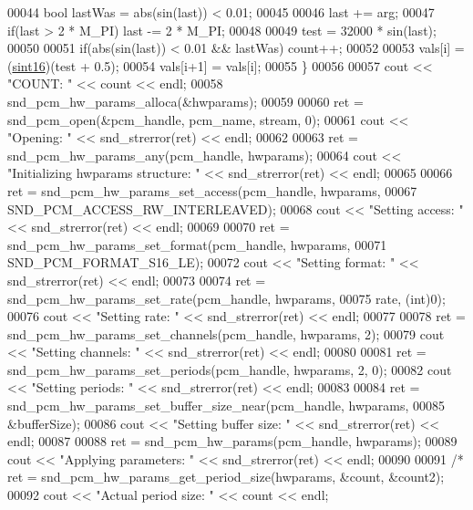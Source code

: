 \begin{DoxyCode}
00044         \textcolor{keywordtype}{bool} lastWas = abs(sin(last)) < 0.01;
00045 
00046         last += arg;
00047         \textcolor{keywordflow}{if}(last > 2 * M\_PI) last -= 2 * M\_PI;
00048 
00049         test = 32000 * sin(last);
00050 
00051         \textcolor{keywordflow}{if}(abs(sin(last)) < 0.01 && lastWas) count++;
00052 
00053         vals[i] = (\hyperlink{definitions_8hpp_a74df79fde3c518e55b29ce6360a9c76e}{sint16})(test + 0.5);
00054         vals[i+1] = vals[i];
00055     \}
00056 
00057     cout << \textcolor{stringliteral}{"COUNT: "} << count << endl;
00058     snd\_pcm\_hw\_params\_alloca(&hwparams);
00059 
00060     ret = snd\_pcm\_open(&pcm\_handle, pcm\_name, stream, 0);
00061     cout << \textcolor{stringliteral}{"Opening: "} << snd\_strerror(ret) << endl;
00062 
00063     ret = snd\_pcm\_hw\_params\_any(pcm\_handle, hwparams);
00064     cout << \textcolor{stringliteral}{"Initializing hwparams structure: "} << snd\_strerror(ret) << endl;   
00065 
00066     ret = snd\_pcm\_hw\_params\_set\_access(pcm\_handle, hwparams,
00067             SND\_PCM\_ACCESS\_RW\_INTERLEAVED);
00068     cout << \textcolor{stringliteral}{"Setting access: "} << snd\_strerror(ret) << endl;
00069 
00070     ret = snd\_pcm\_hw\_params\_set\_format(pcm\_handle, hwparams,
00071             SND\_PCM\_FORMAT\_S16\_LE);
00072     cout << \textcolor{stringliteral}{"Setting format: "} << snd\_strerror(ret) << endl;
00073 
00074     ret = snd\_pcm\_hw\_params\_set\_rate(pcm\_handle, hwparams,
00075             rate, (\textcolor{keywordtype}{int})0);
00076     cout << \textcolor{stringliteral}{"Setting rate: "} << snd\_strerror(ret) << endl;
00077 
00078     ret = snd\_pcm\_hw\_params\_set\_channels(pcm\_handle, hwparams, 2); 
00079     cout << \textcolor{stringliteral}{"Setting channels: "} << snd\_strerror(ret) << endl;
00080 
00081     ret = snd\_pcm\_hw\_params\_set\_periods(pcm\_handle, hwparams, 2, 0);
00082     cout << \textcolor{stringliteral}{"Setting periods: "} << snd\_strerror(ret) << endl;
00083 
00084     ret = snd\_pcm\_hw\_params\_set\_buffer\_size\_near(pcm\_handle, hwparams,
00085             &bufferSize);
00086     cout << \textcolor{stringliteral}{"Setting buffer size: "} << snd\_strerror(ret) << endl;
00087 
00088     ret = snd\_pcm\_hw\_params(pcm\_handle, hwparams);
00089     cout << \textcolor{stringliteral}{"Applying parameters: "} << snd\_strerror(ret) << endl;
00090 
00091 \textcolor{comment}{/*  ret = snd\_pcm\_hw\_params\_get\_period\_size(hwparams, &count, &count2);}
00092 \textcolor{comment}{    cout << "Actual period size: " << count << endl;}

\end{DoxyCode}
